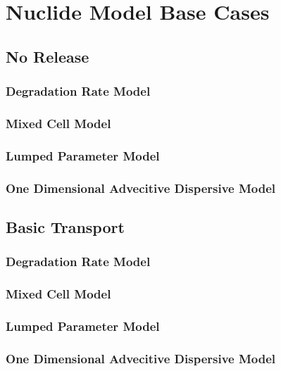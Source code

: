 \section{Nuclide Model Base Cases}\label{sec:nuclide_base_cases}
\subsection{No Release}
\subsubsection{Degradation Rate Model}
\subsubsection{Mixed Cell Model}
\subsubsection{Lumped Parameter Model}
\subsubsection{One Dimensional Advecitive Dispersive Model}
\subsection{Basic Transport}
\subsubsection{Degradation Rate Model}
\subsubsection{Mixed Cell Model}
\subsubsection{Lumped Parameter Model}
\subsubsection{One Dimensional Advecitive Dispersive Model}
